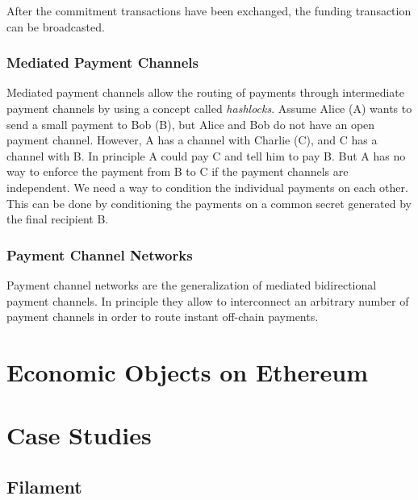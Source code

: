 After the commitment transactions have been exchanged, the funding transaction can be broadcasted. 

\subsubsection{Mediated Payment Channels}

Mediated payment channels allow the routing of payments through intermediate payment channels by using a concept called \emph{hashlocks}. Assume Alice (A) wants to send a small payment to Bob (B), but Alice and Bob do not have an open payment channel. However, A has a channel with Charlie (C), and C has a channel with B. In principle A could pay C and tell him to pay B. But A has no way to enforce the payment from B to C if the payment channels are independent. We need a way to condition the individual payments on each other. This can be done by conditioning the payments on a common secret generated by the final recipient B.

\subsubsection{Payment Channel Networks}
\label{sec:paymentchannelnetworks}

Payment channel networks are the generalization of mediated bidirectional payment channels. In principle they allow to interconnect an arbitrary number of payment channels in order to route instant off-chain payments. 


\section{Economic Objects on Ethereum}
\section{Case Studies}

\subsection{Filament}

